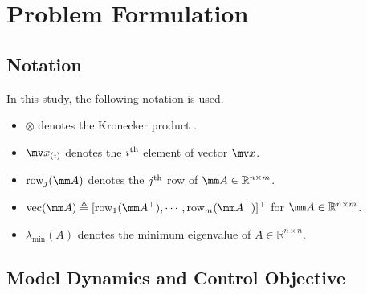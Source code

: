 \documentclass[letterpaper, 10 pt, conference]{ieeeconf}  %
\begin{document}
\section{Problem Formulation}\label{sec: Problem Formulation}

\subsection{Notation}
In this study, the following notation is used.

\begin{itemize}
    \item $\otimes$ denotes the Kronecker product \cite{RN22}.
    \item $\mv x_{(i)}$ denotes the $i\textsuperscript{th}$ element of vector $\mv x$.    
    \item $\text{row}_j(\mm A)$ denotes the $j\textsuperscript{th}$ row of $\mm A\in\mathbb{R}^{n\times m}$. 
    \item $\text{vec}(\mm A)\triangleq [\text{row}_1(\mm A^\top )  ,\cdots,\text{row}_m(\mm A^\top )]^\top $ for $\mm A\in\mathbb{R}^{n\times m}$.
    \item $\lambda_\text{min}(A)$ denotes the minimum eigenvalue of $A\in\mathbb{R}^{n\times n}$.
\end{itemize}

\subsection{Model Dynamics and Control Objective}
\end{document}

